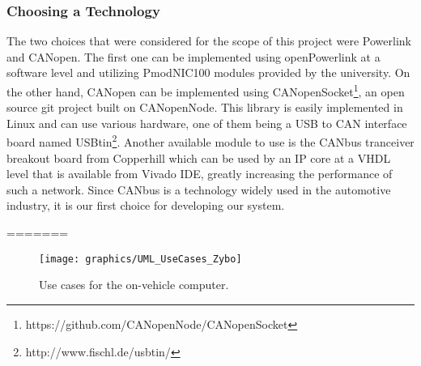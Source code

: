\subsubsection{Choosing a Technology}
The two choices that were considered for the scope of this project were Powerlink and CANopen.
The first one can be implemented using openPowerlink at a software level and utilizing PmodNIC100 modules provided by the university.
On the other hand, CANopen can be implemented using CANopenSocket\footnote{https://github.com/CANopenNode/CANopenSocket}, an open source git project built on CANopenNode.
This library is easily implemented in Linux and can use various hardware, one of them being a USB to CAN interface board named USBtin\footnote{http://www.fischl.de/usbtin/}.
Another available module to use is the CANbus tranceiver breakout board from Copperhill which can be used by an IP core at a VHDL level that is available from Vivado IDE, greatly increasing the performance of such a network.
Since CANbus is a technology widely used in the automotive industry, it is our first choice for developing our system.

=======

\begin{figure}
\caption{Use cases for the on-vehicle computer.}
\texttt{[image: graphics/UML\_UseCases\_Zybo]}
\end{figure}

